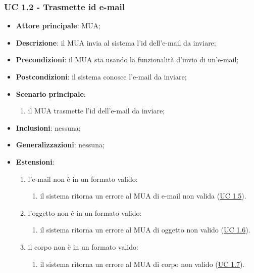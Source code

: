     \subsubsection{UC 1.2 - Trasmette id e-mail} \label{sec:UC1.2}
    \begin{itemize}
        \item \textbf{Attore principale}: MUA;
        \item \textbf{Descrizione}: il MUA invia al sistema l'id dell'e-mail da inviare;
        \item \textbf{Precondizioni}: il MUA sta usando la funzionalità d'invio di un'e-mail;
        \item \textbf{Postcondizioni}: il sistema conosce l'e-mail da inviare;
        \item \textbf{Scenario principale}:
            \begin{enumerate}
                \item il MUA trasmette l'id dell'e-mail da inviare;
            \end{enumerate}
        \item \textbf{Inclusioni}: nessuna;
        \item \textbf{Generalizzazioni}: nessuna;
        \item \textbf{Estensioni}:
            \begin{enumerate}[label=\alph*.]
                \item l'e-mail non è in un formato valido:
                \begin{enumerate}[label=\arabic*.]
                    \item il sistema ritorna un errore al MUA di e-mail non valida (\hyperref[sec:UC1.5]{UC 1.5}).
                \end{enumerate}
                \item l'oggetto non è in un formato valido:
                \begin{enumerate}[label=\arabic*.]
                    \item il sistema ritorna un errore al MUA di oggetto non valido (\hyperref[sec:UC1.6]{UC 1.6}).
                \end{enumerate}
                \item il corpo non è in un formato valido:
                \begin{enumerate}[label=\arabic*.]
                    \item il sistema ritorna un errore al MUA di corpo non valido (\hyperref[sec:UC1.7]{UC 1.7}).
                \end{enumerate}
            \end{enumerate}
    \end{itemize}

